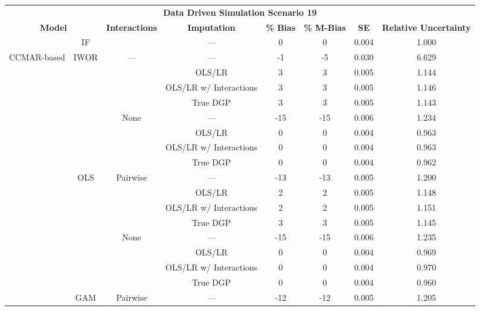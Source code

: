\begin{table}
\centering
\begin{tabular}[ht]{|>{}c|c|c|c|c|c|c|>{}c|}
\hline
\multicolumn{8}{|c|}{\textbf{Data Driven Simulation Scenario 19}} \\
\cline{1-8}
\multicolumn{2}{|c|}{\textbf{Model}} & \textbf{Interactions} & \textbf{Imputation} & \textbf{\% Bias} & \textbf{\% M-Bias} & \textbf{SE} & \textbf{Relative Uncertainty}\\
\hline
 & IF &  & --- & 0 & 0 & 0.004 & 1.000\\
\cline{2-2}
\cline{4-8}
\multirow{-2}{*}{\centering\arraybackslash CCMAR-based} & IWOR & \multirow{-2}{*}{\centering\arraybackslash ---} & --- & -1 & -5 & 0.030 & 6.629\\
\cline{1-8}
 &  &  & OLS/LR & 3 & 3 & 0.005 & 1.144\\
\cline{4-8}
 &  &  & OLS/LR w/ Interactions & 3 & 3 & 0.005 & 1.146\\
\cline{4-8}
 &  &  & True DGP & 3 & 3 & 0.005 & 1.143\\
\cline{4-8}
 &  & \multirow{-4}{*}{\centering\arraybackslash None} & --- & -15 & -15 & 0.006 & 1.234\\
\cline{3-8}
 &  &  & OLS/LR & 0 & 0 & 0.004 & 0.963\\
\cline{4-8}
 &  &  & OLS/LR w/ Interactions & 0 & 0 & 0.004 & 0.963\\
\cline{4-8}
 &  &  & True DGP & 0 & 0 & 0.004 & 0.962\\
\cline{4-8}
 & \multirow{-8}{*}{\centering\arraybackslash OLS} & \multirow{-4}{*}{\centering\arraybackslash Pairwise} & --- & -13 & -13 & 0.005 & 1.200\\
\cline{2-8}
 &  &  & OLS/LR & 2 & 2 & 0.005 & 1.148\\
\cline{4-8}
 &  &  & OLS/LR w/ Interactions & 2 & 2 & 0.005 & 1.151\\
\cline{4-8}
 &  &  & True DGP & 3 & 3 & 0.005 & 1.145\\
\cline{4-8}
 &  & \multirow{-4}{*}{\centering\arraybackslash None} & --- & -15 & -15 & 0.006 & 1.235\\
\cline{3-8}
 &  &  & OLS/LR & 0 & 0 & 0.004 & 0.969\\
\cline{4-8}
 &  &  & OLS/LR w/ Interactions & 0 & 0 & 0.004 & 0.970\\
\cline{4-8}
 &  &  & True DGP & 0 & 0 & 0.004 & 0.960\\
\cline{4-8}
 & \multirow{-8}{*}{\centering\arraybackslash GAM} & \multirow{-4}{*}{\centering\arraybackslash Pairwise} & --- & -12 & -12 & 0.005 & 1.205\\

\end{tabular}
\end{table}
